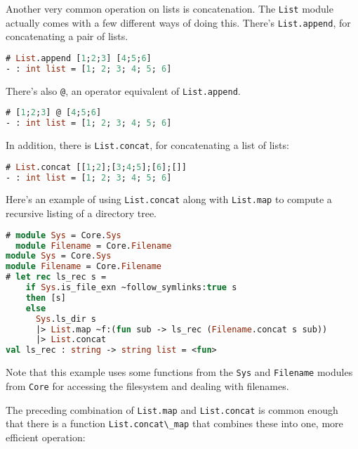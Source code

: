 Another very common operation on lists is concatenation. The
\passthrough{\lstinline!List!} module actually comes with a few
different ways of doing this. There's
\passthrough{\lstinline!List.append!}, for concatenating a pair of
lists. 

\begin{lstlisting}[language=Caml]
# List.append [1;2;3] [4;5;6]
- : int list = [1; 2; 3; 4; 5; 6]
\end{lstlisting}

There's also \passthrough{\lstinline!@!}, an operator equivalent of
\passthrough{\lstinline!List.append!}.

\begin{lstlisting}[language=Caml]
# [1;2;3] @ [4;5;6]
- : int list = [1; 2; 3; 4; 5; 6]
\end{lstlisting}

In addition, there is \passthrough{\lstinline!List.concat!}, for
concatenating a list of lists:

\begin{lstlisting}[language=Caml]
# List.concat [[1;2];[3;4;5];[6];[]]
- : int list = [1; 2; 3; 4; 5; 6]
\end{lstlisting}

Here's an example of using \passthrough{\lstinline!List.concat!} along
with \passthrough{\lstinline!List.map!} to compute a recursive listing
of a directory tree.

\begin{lstlisting}[language=Caml]
# module Sys = Core.Sys
  module Filename = Core.Filename
module Sys = Core.Sys
module Filename = Core.Filename
# let rec ls_rec s =
    if Sys.is_file_exn ~follow_symlinks:true s
    then [s]
    else
      Sys.ls_dir s
      |> List.map ~f:(fun sub -> ls_rec (Filename.concat s sub))
      |> List.concat
val ls_rec : string -> string list = <fun>
\end{lstlisting}

Note that this example uses some functions from the
\passthrough{\lstinline!Sys!} and \passthrough{\lstinline!Filename!}
modules from \passthrough{\lstinline!Core!} for accessing the filesystem
and dealing with filenames.

The preceding combination of \passthrough{\lstinline!List.map!} and
\passthrough{\lstinline!List.concat!} is common enough that there is a
function \passthrough{\lstinline!List.concat\_map!} that combines these
into one, more efficient operation:

